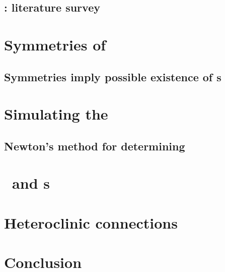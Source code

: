 \documentclass[hyperref]{inputs/gatech-thesis}
\begin{document}
    \section{\KS: literature survey}
        \label{sec:KSlit}
        

\chapter{\KSe}
\label{chap:pCf}
%    


\chapter{Symmetries of \KS}
\label{chap:Symmetry}
    \section{Symmetries imply possible existence of \rpo s}
        \label{sec:SymRPO}
        


\chapter{Simulating the \KSe}
\label{chap:Numerics}
    \section{Newton's method for determining \reqva}
        


\chapter{\Eqva\ and \po s}

\chapter{Heteroclinic connections}

\chapter{Conclusion}
\end{document}
